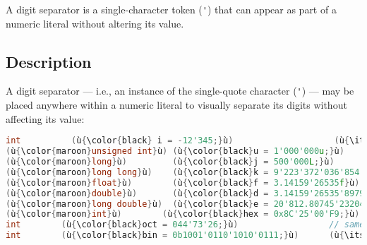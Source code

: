 

A digit separator is a single-character token (\lstinline!'!) that can appear as part of a
numeric literal without altering its value.

\subsection[Description]{Description}\label{description}

A digit separator --- i.e., an instance of the single-quote
character (\lstinline!'!) --- may be placed anywhere within a numeric
literal to visually separate its digits without affecting its value:


\begin{lstlisting}[language=C++]
int          (ù{\color{black} i = -12'345;}ù)                    (ù{\itshape\color{skyblue}// same as}ù) (ù{\codeincomments{-12345}}ù)
(ù{\color{maroon}unsigned int}ù) (ù{\color{black}u = 1'000'000u;}ù)                 (ù{\itshape\color{skyblue}// same as}ù) (ù{\codeincomments{1000000u}}ù)
(ù{\color{maroon}long}ù)         (ù{\color{black}j = 500'000L;}ù)                   // same as (ù{\codeincomments{500000L}}ù)
(ù{\color{maroon}long long}ù)    (ù{\color{black}k = 9'223'372'036'854'775'807;}ù)  // same as (ù{\codeincomments{9223372036854775807}}ù)
(ù{\color{maroon}float}ù)        (ù{\color{black}f = 3.14159'26535f}ù)              // same as (ù{\codeincomments{3.1415926535f}}ù)
(ù{\color{maroon}double}ù)       (ù{\color{black}d = 3.14159'26535'89793;}ù)        (ù{\itshape\color{skyblue}// same as}ù) (ù{\codeincomments{3.141592653589793}}ù)
(ù{\color{maroon}long double}ù)  (ù{\color{black}e = 20'812.80745'23204}ù)          (ù{\itshape\color{skyblue}// same as}ù) (ù{\codeincomments{20812.8074523204}}ù)
(ù{\color{maroon}int}ù)        (ù{\color{black}hex = 0x8C'25'00'F9;}ù)              // same as (ù{\codeincomments{0x8C2500F9}}ù)
int        (ù{\color{black}oct = 044'73'26;}ù)                  // same as (ù{\codeincomments{0447326}}ù)
int        (ù{\color{black}bin = 0b1001'0110'1010'0111;}ù)      (ù{\itshape\color{skyblue}// same as}ù) (ù{\codeincomments{0b1001011010100111}}ù)
\end{lstlisting}
    
